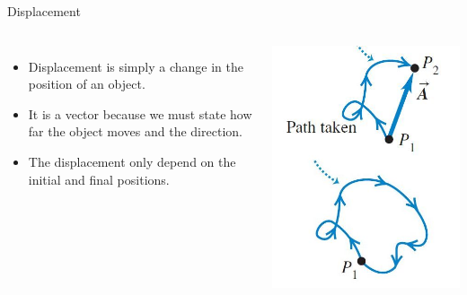 \documentclass[]{beamer}
\begin{document}
        
\begin{frame}
  Displacement 
  \vspace{3 mm}
  
  
  
     \begin{columns}[c]
     \column{2in}  %
    
  
  
  \begin{itemize}
  \item Displacement is simply a change in the position of an object. 
  
  \item It  is a vector because we must state how far the object moves and the direction.
  
  \item The displacement only depend on the initial and final positions.
  \end{itemize}
  
  
     \column{2in}
  
  
  
  
    \begin{center}
    \includegraphics[height=2.in]{images/dis2.jpg}
  \end{center}
  
  
     \end{columns}
  
   \end{frame}
\end{document}
